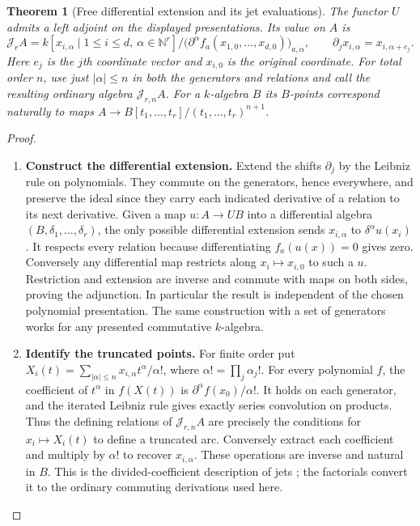 \documentclass[11pt,a4paper]{article}
\newtheorem{theorem}{Theorem}[section]
\theoremstyle{definition}
\theoremstyle{remark}\newaliascnt{remark}{theorem}
\newcommand{\N}{\mathbb N}
\numberwithin{equation}{section}
\begin{document}
\begin{theorem}[Free differential extension and its jet evaluations]\label{thm:free-differential-extension}
The functor $U$ admits a left adjoint on the displayed presentations. Its value on $A$ is
\[
 \mathcal J_r A=
 k[x_{i,\alpha}\mid 1\le i\le d,\ \alpha\in\N^r]\big/
       \big(\partial^\alpha f_a(x_{1,0},\ldots,x_{d,0})\big)_{a,\alpha},
 \qquad \partial_j x_{i,\alpha}=x_{i,\alpha+e_j}.
\]
Here $e_j$ is the $j$th coordinate vector and $x_{i,0}$ is the original coordinate. For total order $n$, use just $|\alpha|\le n$ in both the generators and relations and call the resulting ordinary algebra $\mathcal J_{r,n} A$. For a $k$-algebra $B$ its $B$-points correspond naturally to maps $A\to B[t_1,\ldots,t_r]/(t_1,\ldots,t_r)^{n+1}$.
\end{theorem}
\begin{proof}\leavevmode
\begin{enumerate}[titledsteps]
    \item \textbf{Construct the differential extension.} Extend the shifts $\partial_j$ by the Leibniz rule on polynomials. They commute on the generators, hence everywhere, and preserve the ideal since they carry each indicated derivative of a relation to its next derivative. Given a map $u:A\to UB$ into a differential algebra $(B,\delta_1,\ldots,\delta_r)$, the only possible differential extension sends $x_{i,\alpha}$ to $\delta^\alpha u(x_i)$. It respects every relation because differentiating $f_a(u(x))=0$ gives zero. Conversely any differential map restricts along $x_i\mapsto x_{i,0}$ to such a $u$. Restriction and extension are inverse and commute with maps on both sides, proving the adjunction. In particular the result is independent of the chosen polynomial presentation. The same construction with a set of generators works for any presented commutative $k$-algebra.


    \item \textbf{Identify the truncated points.} For finite order put $X_i(t)=\sum_{|\alpha|\le n}x_{i,\alpha}t^\alpha/\alpha!$, where $\alpha!=\prod_j\alpha_j!$. For every polynomial $f$, the coefficient of $t^\alpha$ in $f(X(t))$ is $\partial^\alpha f(x_0)/\alpha!$. It holds on each generator, and the iterated Leibniz rule gives exactly series convolution on products. Thus the defining relations of $\mathcal J_{r,n} A$ are precisely the conditions for $x_i\mapsto X_i(t)$ to define a truncated arc. Conversely extract each coefficient and multiply by $\alpha!$ to recover $x_{i,\alpha}$. These operations are inverse and natural in $B$. This is the divided-coefficient description of jets \cite{vojta-jets}; the factorials convert it to the ordinary commuting derivations used here.\qedhere
\end{enumerate}
\end{proof}
\end{document}

